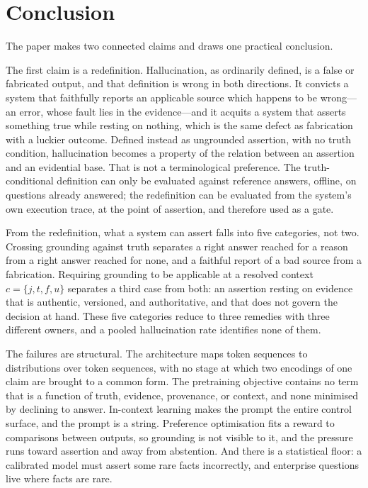 \documentclass[11pt]{article}
\theoremstyle{plain}
\theoremstyle{definition}
\begin{document}
\section{Conclusion}
\label{sec:conclusion}

The paper makes two connected claims and draws one practical conclusion.

The first claim is a redefinition. Hallucination, as ordinarily defined, is a false
or fabricated output, and that definition is wrong in both directions. It convicts a
system that faithfully reports an applicable source which happens to be
wrong---an error, whose fault lies in the evidence---and it acquits a system that
asserts something true while resting on nothing, which is the same defect as
fabrication with a luckier outcome. Defined instead as ungrounded assertion, with no
truth condition, hallucination becomes a property of the relation between an
assertion and an evidential base. That is not a terminological preference. The
truth-conditional definition can only be evaluated against reference answers, offline,
on questions already answered; the redefinition can be evaluated from the system's
own execution trace, at the point of assertion, and therefore used as a gate.

From the redefinition, what a system can assert falls into five categories, not two. Crossing
grounding against truth separates a right answer reached for a reason from a right
answer reached for none, and a faithful report of a bad source from a fabrication.
Requiring grounding to be applicable at a resolved context $c = \{j, t, f, u\}$
separates a third case from both: an assertion resting on evidence that is
authentic, versioned, and authoritative, and that does not govern the decision at
hand. These five categories reduce to three remedies with three different owners,
and a pooled hallucination rate identifies none of them.

The failures are structural. The architecture maps token sequences to
distributions over token sequences, with no stage at which two encodings of one
claim are brought to a common form. The pretraining objective contains no term that
is a function of truth, evidence, provenance, or context, and none minimised by
declining to answer. In-context learning makes the prompt the entire control
surface, and the prompt is a string. Preference optimisation fits a reward to
comparisons between outputs, so grounding is not visible to it, and the pressure
runs toward assertion and away from abstention. And there is a statistical floor: a
calibrated model must assert some rare facts incorrectly, and enterprise questions
live where facts are rare.
\end{document}
